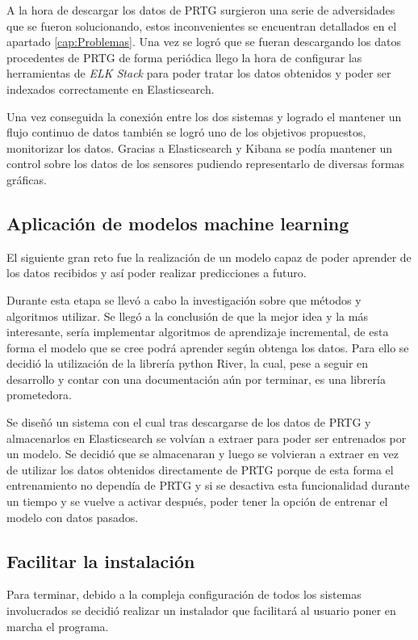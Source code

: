 A la hora de descargar los datos de PRTG surgieron una serie de adversidades que se fueron solucionando, estos inconvenientes se encuentran detallados en el apartado \ref{cap:Problemas}. Una vez se logró que se fueran descargando los datos procedentes de PRTG de forma periódica llego la hora de configurar las herramientas de \textit{ELK Stack} para poder tratar los datos obtenidos y poder ser indexados correctamente en Elasticsearch.

Una vez conseguida la conexión entre los dos sistemas y logrado el mantener un flujo continuo de datos también se logró uno de los objetivos propuestos, monitorizar los datos. Gracias a Elasticsearch y Kibana se podía mantener un control sobre los datos de los sensores pudiendo representarlo de diversas formas gráficas.

\subsection{Aplicación de modelos machine learning}

El siguiente gran reto fue la realización de un modelo capaz de poder aprender de los datos recibidos y así poder realizar predicciones a futuro.

Durante esta etapa se llevó a cabo la investigación sobre que métodos y algoritmos utilizar. Se llegó a la conclusión de que la mejor idea y la más interesante, sería implementar algoritmos de aprendizaje incremental, de esta forma el modelo que se cree podrá aprender según obtenga los datos. Para ello se decidió la utilización de la librería python River, la cual, pese a seguir en desarrollo y contar con una documentación aún por terminar, es una librería prometedora.

Se diseñó un sistema con el cual tras descargarse de los datos de PRTG y almacenarlos en Elasticsearch se volvían a extraer para poder ser entrenados por un modelo. Se decidió que se almacenaran y luego se volvieran a extraer en vez de utilizar los datos obtenidos directamente de PRTG porque de esta forma el entrenamiento no dependía de PRTG y si se desactiva esta funcionalidad durante un tiempo y se vuelve a activar después, poder tener la opción de entrenar el modelo con datos pasados.

\subsection{Facilitar la instalación}
Para terminar, debido a la compleja configuración de todos los sistemas involucrados se decidió realizar un instalador que facilitará al usuario poner en marcha el programa.


